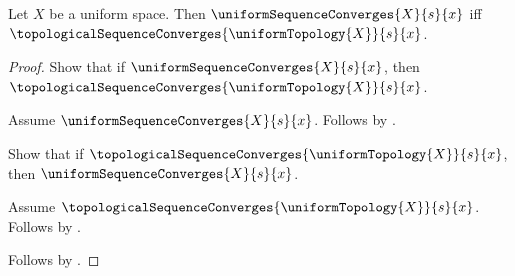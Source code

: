 \begin{theorem}\label{uniform_sequence_convergence_iff_topological}
    Let $X$ be a uniform space.
    Then $\uniformSequenceConverges{X}{s}{x}$ iff
        $\topologicalSequenceConverges{\uniformTopology{X}}{s}{x}$.
\end{theorem}
\begin{proof}
    Show that if $\uniformSequenceConverges{X}{s}{x}$, then
        $\topologicalSequenceConverges{\uniformTopology{X}}{s}{x}$.
    \begin{subproof}
        Assume $\uniformSequenceConverges{X}{s}{x}$.
        Follows by .
    \end{subproof}
    Show that if
        $\topologicalSequenceConverges{\uniformTopology{X}}{s}{x}$, then
        $\uniformSequenceConverges{X}{s}{x}$.
    \begin{subproof}
        Assume $\topologicalSequenceConverges{\uniformTopology{X}}{s}{x}$.
        Follows by .
    \end{subproof}
    Follows by \auto.
\end{proof}


